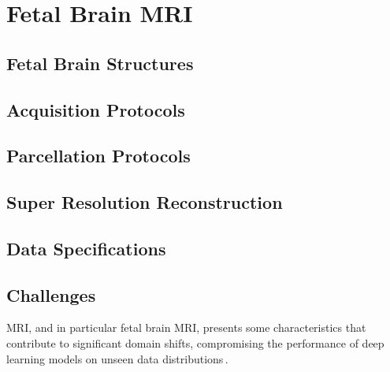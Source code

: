 \chapter{Fetal Brain MRI} \label{chap:FetalBrainMRI}
\vspace{1cm}



\section{Fetal Brain Structures}

\section{Acquisition Protocols}

\section{Parcellation Protocols}

\section{Super Resolution Reconstruction}

\section{Data Specifications}

\section{Challenges} \label{sec:Challenges}
MRI, and in particular fetal brain MRI, presents some characteristics that contribute to significant domain shifts, compromising the performance of deep learning models on unseen data distributions\,\cite{FeTA2024_paper, FeTA2024_review}.

